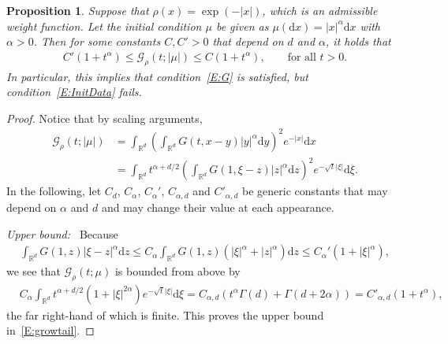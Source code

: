 \documentclass[sn-mathphys]{sn-jnl}%
\newcommand{\BR}{\mathbb{R}}
\newcommand{\ud}{\ensuremath{\mathrm{d}}}
\numberwithin{equation}{section}
\theoremstyle{thmstyleone}%
\newtheorem{proposition}[theorem]{Proposition}%
\theoremstyle{thmstyletwo}%
\theoremstyle{thmstylethree}%
\begin{document}
\begin{proposition}\label{P:growtail}
  Suppose that $\rho(x) = \exp(-\lvert x \rvert)$, which is an admissible weight function. Let the initial
  condition $\mu$ be given as $\mu(\ud x) = \lvert x \rvert^\alpha \ud x$ with $\alpha>0$. Then for some
  constants $C, C'>0$ that depend on $d$ and $\alpha$, it holds that
  \begin{align}\label{E:growtail}
    C' (1+t^\alpha) \le \mathcal{G}_\rho(t;\lvert \mu \rvert) \le C (1+t^\alpha), \qquad \text{for all $t>0$}.
  \end{align}
  In particular, this implies that condition~\eqref{E:G} is satisfied, but condition~\eqref{E:InitData} fails.
\end{proposition}
\begin{proof}
  Notice that by scaling arguments,
  \begin{align*}
    \mathcal{G}_\rho(t;\lvert \mu \rvert)
      & =  \int_{\BR^d} \left(\int_{\BR^d}G(t,x-y) \lvert y \rvert^\alpha \ud y\right)^2 e^{-\lvert x \rvert} \ud x \\
      & = \int_{\BR^d}t^{\alpha+d/2} \left(\int_{\BR^d}G\left(1,\xi-z\right) \lvert z \rvert^\alpha \ud z\right)^2 e^{-\sqrt{t}\lvert\xi\rvert} \ud \xi.
  \end{align*}
  In the following, let $C_d$, $C_\alpha$, $C_\alpha'$, $C_{\alpha, d}$ and $C'_{\alpha, d}$ be
  generic constants that may depend on $\alpha $ and $d$ and may change their value at each
  appearance. \medskip

  \noindent\textit{Upper bound:~} Because
  \begin{align*}
    \int_{\BR^d}G\left(1,z\right) \lvert \xi-z \rvert^\alpha \ud z
    \le C_\alpha \int_{\BR^d}G\left(1,z\right) \left(\lvert\xi\rvert^\alpha + \lvert z \rvert^\alpha\right) \ud z
    \le C_\alpha' \left(1+\lvert\xi\rvert^\alpha\right),
  \end{align*}
  we see that $\mathcal{G}_\rho(t;\mu)$ is bounded from above by
  \begin{align*}
    & C_\alpha \int_{\BR^d}t^{\alpha+d/2} \left(1+\lvert\xi\rvert^{2\alpha}\right) e^{-\sqrt{t}\lvert\xi\rvert} \ud \xi
      = C_{\alpha, d} \left(t^\alpha \Gamma(d) + \Gamma(d+2\alpha)\right)
      = C'_{\alpha, d} (1+ t^\alpha),
  \end{align*}
  the far right-hand of which is finite. This proves the upper bound in~\eqref{E:growtail}. \medskip


\end{proof}
\end{document}
